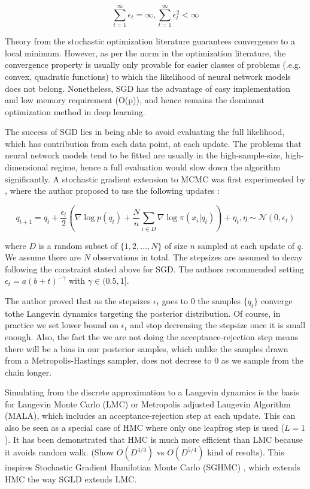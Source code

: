 \documentclass[]{report}
\begin{document}
\[ \sum_{t=1}^\infty \epsilon_t = \infty , \sum_{t=1}^\infty \epsilon_t^2 < \infty \]

Theory from the stochastic optimization literature \cite{robbins1951stochastic} guarantees convergence to a local minimum. However, as per the norm in the optimization literature, the convergence property is usually only provable for easier classes of problems (.e.g. convex, quadratic functions) to which the likelihood of neural network models does not belong. Nonetheless, SGD has the advantage of easy implementation and low memory requirement (O(p)), and hence remains the dominant optimization method in deep learning.  

The success of SGD lies in being able to avoid evaluating the full likelihood, which has contribution from each data point, at each update. The problems that neural network models tend to be fitted are usually in the high-sample-size, high-dimensional regime, hence a full evaluation would slow down the algorithm significantly. A stochastic gradient extension to MCMC was first experimented by \cite{welling2011bayesian}, where the author proposed to use the following updates :

\[q_{t+1} = q_t + \frac{\epsilon_t}{2} ( \nabla \log p(q_t) + \frac{N}{n} \sum_{i \in D} \nabla \log \pi(x_i|q_t) ) + \eta_t , \eta \sim \mathcal{N}(0,\epsilon_t) \]

where $D$ is a random subset of $\{1,2, \dots, N\}$ of size $n$ sampled at each update of $q$. We assume there are $N$ observations in total. The stepsizes are assumed to decay following the constraint stated above for SGD. The authors recommended setting $\epsilon_t = a(b+t)^{-\gamma} $ with $\gamma \in (0.5,1]$.  

The author proved that as the stepsizes $\epsilon_t$ goes to $0$ the samples $\{q_t\}$ converge tothe Langevin dynamics targeting the posterior distribution. Of course, in practice we set lower bound on $\epsilon_t$ and stop decreasing the stepsize once it is small enough. Also, the fact the we are not doing the acceptance-rejection step means there will be a bias in our posterior samples, which unlike the samples drawn from a Metropolis-Hastings sampler, does not decrese to $0$ as we sample from the chain longer.



Simulating from the discrete approximation to a Langevin dynamics is the basis
for Langevin Monte Carlo (LMC) or Metropolis adjusted Langevin Algorithm (MALA), which
includes an acceptance-rejection step at each update. This can also be seen as a
special case of HMC where only one leapfrog step is used ($L=1$). It has been
demonstrated that HMC is much more efficient than LMC because it avoids random
walk. (Show $O(D^{4/3})$ vs $O(D^{5/4})$ kind of results). This inspires
Stochastic Gradient Hamilotian Monte Carlo (SGHMC) ,
which extends HMC the way SGLD extends LMC. 
\end{document}
